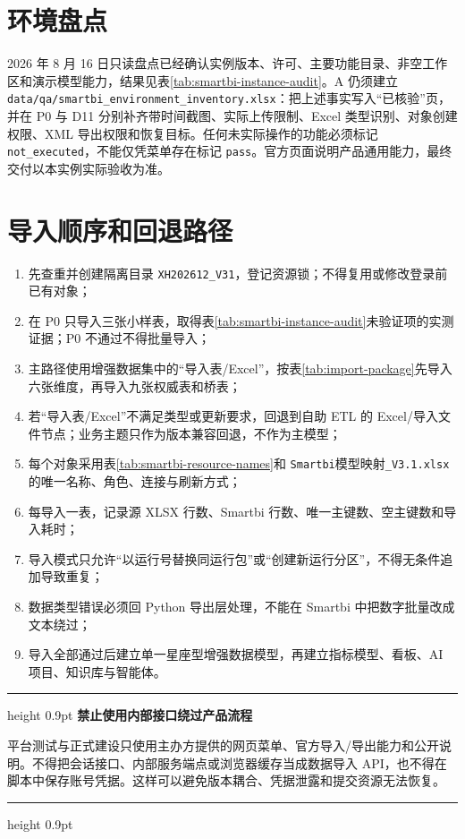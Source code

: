 \documentclass[UTF8,fontset=windows,12pt,openany]{ctexbook}
\newenvironment{warningbox}[1][]{%
  \par\medskip\noindent\begin{center}\begin{minipage}{0.93\textwidth}%
  \color{TextGray}\hrule height 0.9pt\vspace{0.45em}%
  \textbf{#1}\par\smallskip\color{black}%
}{%
  \par\vspace{0.35em}\color{TextGray}\hrule height 0.9pt%
  \end{minipage}\end{center}\medskip%
}
\newcommand{\Field}[1]{{\small\nolinkurl{#1}}}
\newcommand{\File}[1]{{\small\nolinkurl{#1}}}
\begin{document}
\section{环境盘点}

2026 年 8 月 16 日只读盘点已经确认实例版本、许可、主要功能目录、非空工作区和演示模型能力，结果见表\ref{tab:smartbi-instance-audit}。A 仍须建立 \File{data/qa/smartbi_environment_inventory.xlsx}：把上述事实写入“已核验”页，并在 P0 与 D11 分别补齐带时间截图、实际上传限制、Excel 类型识别、对象创建权限、XML 导出权限和恢复目标。任何未实际操作的功能必须标记 \Field{not_executed}，不能仅凭菜单存在标记 \Field{pass}。官方页面说明产品通用能力\cite{smartbiversion,smartbiprepare,smartbiaichat}，最终交付以本实例实际验收为准。

\section{导入顺序和回退路径}

\begin{enumerate}
  \item 先查重并创建隔离目录 \Field{XH202612_V31}，登记资源锁；不得复用或修改登录前已有对象；
  \item 在 P0 只导入三张小样表，取得表\ref{tab:smartbi-instance-audit}未验证项的实测证据；P0 不通过不得批量导入；
  \item 主路径使用增强数据集中的“导入表/Excel”，按表\ref{tab:import-package}先导入六张维度，再导入九张权威表和桥表；
  \item 若“导入表/Excel”不满足类型或更新要求，回退到自助 ETL 的 Excel/导入文件节点；业务主题只作为版本兼容回退，不作为主模型；
  \item 每个对象采用表\ref{tab:smartbi-resource-names}和 \File{Smartbi}\textsf{模型映射}\File{_V3.1.xlsx}的唯一名称、角色、连接与刷新方式；
  \item 每导入一表，记录源 XLSX 行数、Smartbi 行数、唯一主键数、空主键数和导入耗时；
  \item 导入模式只允许“以运行号替换同运行包”或“创建新运行分区”，不得无条件追加导致重复；
  \item 数据类型错误必须回 Python 导出层处理，不能在 Smartbi 中把数字批量改成文本绕过；
  \item 导入全部通过后建立单一星座型增强数据模型，再建立指标模型、看板、AI 项目、知识库与智能体。
\end{enumerate}

\begin{warningbox}[禁止使用内部接口绕过产品流程]
平台测试与正式建设只使用主办方提供的网页菜单、官方导入/导出能力和公开说明。不得把会话接口、内部服务端点或浏览器缓存当成数据导入 API，也不得在脚本中保存账号凭据。这样可以避免版本耦合、凭据泄露和提交资源无法恢复。
\end{warningbox}
\end{document}
